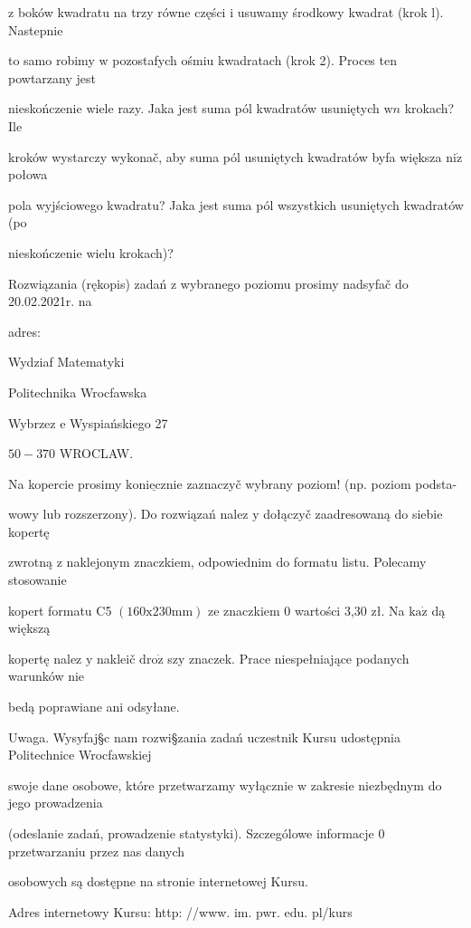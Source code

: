 \documentclass[a4paper,12pt]{article}
\begin{document}
$\mathrm{z}$ boków kwadratu na trzy równe części $\mathrm{i}$ usuwamy środkowy kwadrat (krok l). Nastepnie

to samo robimy $\mathrm{w}$ pozostafych ośmiu kwadratach (krok 2). Proces ten powtarzany jest

nieskończenie wiele razy. Jaka jest suma pól kwadratów usuniętych $\mathrm{w}n$ krokach? Ile

kroków wystarczy wykonač, aby suma pól usuniętych kwadratów byfa większa $\mathrm{n}\mathrm{i}\dot{\mathrm{z}}$ połowa

pola wyjściowego kwadratu? Jaka jest suma pól wszystkich usuniętych kwadratów (po

nieskończenie wielu krokach)?

Rozwiązania (rękopis) zadań z wybranego poziomu prosimy nadsyfač do 20.02.2021r. na

adres:

Wydziaf Matematyki

Politechnika Wrocfawska

Wybrzez $\mathrm{e}$ Wyspiańskiego 27

$50-370$ WROCLAW.

Na kopercie prosimy $\underline{\mathrm{k}\mathrm{o}\mathrm{n}\mathrm{i}\mathrm{e}\mathrm{c}\mathrm{z}\mathrm{n}\mathrm{i}\mathrm{e}}$ zaznaczyč wybrany poziom! (np. poziom podsta-

wowy lub rozszerzony). Do rozwiązań nalez $\mathrm{y}$ dołączyč zaadresowaną do siebie kopertę

zwrotną $\mathrm{z}$ naklejonym znaczkiem, odpowiednim do formatu listu. Polecamy stosowanie

kopert formatu C5 $(160\mathrm{x}230\mathrm{m}\mathrm{m})$ ze znaczkiem $0$ wartości 3,30 zł. Na $\mathrm{k}\mathrm{a}\dot{\mathrm{z}}$ dą większą

kopertę nalez $\mathrm{y}$ nakleič $\mathrm{d}\mathrm{r}\mathrm{o}\dot{\mathrm{z}}$ szy znaczek. Prace niespełniające podanych warunków nie

bedą poprawiane ani odsyłane.

Uwaga. Wysyfaj\S c nam rozwi\S zania zadań uczestnik Kursu udostępnia Politechnice Wrocfawskiej

swoje dane osobowe, które przetwarzamy wyłącznie $\mathrm{w}$ zakresie niezbędnym do jego prowadzenia

(odeslanie zadań, prowadzenie statystyki). Szczególowe informacje $0$ przetwarzaniu przez nas danych

osobowych są dostępne na stronie internetowej Kursu.

Adres internetowy Kursu: http: //www. im. pwr. edu. pl/kurs
\end{document}
